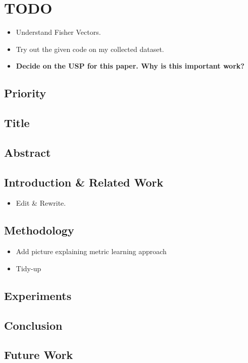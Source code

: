 \section{TODO}\label{todo}

\begin{itemize}
\tightlist
\item
  Understand Fisher Vectors.
\item
  Try out the given code on my collected dataset.
\item
  \textbf{Decide on the USP for this paper. Why is this important work?}
\end{itemize}

\subsection{Priority}\label{priority}

\subsection{Title}\label{title}

\subsection{Abstract}\label{abstract}

\subsection{Introduction \& Related
Work}\label{introduction-related-work}

\begin{itemize}
\tightlist
\item
  Edit \& Rewrite.
\end{itemize}

\subsection{Methodology}\label{methodology}

\begin{itemize}
\tightlist
\item
  Add picture explaining metric learning approach
\item
  Tidy-up
\end{itemize}

\subsection{Experiments}\label{experiments}

\subsection{Conclusion}\label{conclusion}

\subsection{Future Work}\label{future-work}
